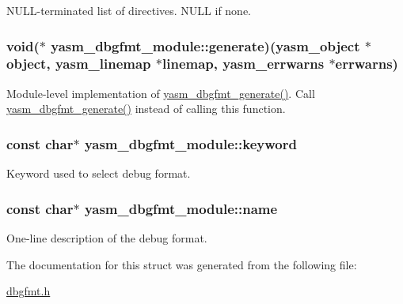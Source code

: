 N\-U\-L\-L-\/terminated list of directives. N\-U\-L\-L if none. \hypertarget{structyasm__dbgfmt__module_a4ace328105e57a701188ad181b24ca54}{
\subsubsection[{generate}]{\setlength{\rightskip}{0pt plus 5cm}void($\ast$ yasm\-\_\-dbgfmt\-\_\-module\-::generate)({\bf yasm\-\_\-object} $\ast$object, {\bf yasm\-\_\-linemap} $\ast$linemap, {\bf yasm\-\_\-errwarns} $\ast$errwarns)}}\label{structyasm__dbgfmt__module_a4ace328105e57a701188ad181b24ca54}
Module-\/level implementation of \hyperlink{dbgfmt_8h_acc15c8447f2f569169156fa0cb8eceb3}{yasm\-\_\-dbgfmt\-\_\-generate()}. Call \hyperlink{dbgfmt_8h_acc15c8447f2f569169156fa0cb8eceb3}{yasm\-\_\-dbgfmt\-\_\-generate()} instead of calling this function. \hypertarget{structyasm__dbgfmt__module_ad76bf17745eea63c499f92b49fec585e}{
\subsubsection[{keyword}]{\setlength{\rightskip}{0pt plus 5cm}const char$\ast$ yasm\-\_\-dbgfmt\-\_\-module\-::keyword}}\label{structyasm__dbgfmt__module_ad76bf17745eea63c499f92b49fec585e}
Keyword used to select debug format. \hypertarget{structyasm__dbgfmt__module_a4cd6a734c7698c6fe9eead782be93ee6}{
\subsubsection[{name}]{\setlength{\rightskip}{0pt plus 5cm}const char$\ast$ yasm\-\_\-dbgfmt\-\_\-module\-::name}}\label{structyasm__dbgfmt__module_a4cd6a734c7698c6fe9eead782be93ee6}
One-\/line description of the debug format. 

The documentation for this struct was generated from the following file\-:\begin{DoxyCompactItemize}
\item 
\hyperlink{dbgfmt_8h}{dbgfmt.\-h}\end{DoxyCompactItemize}
